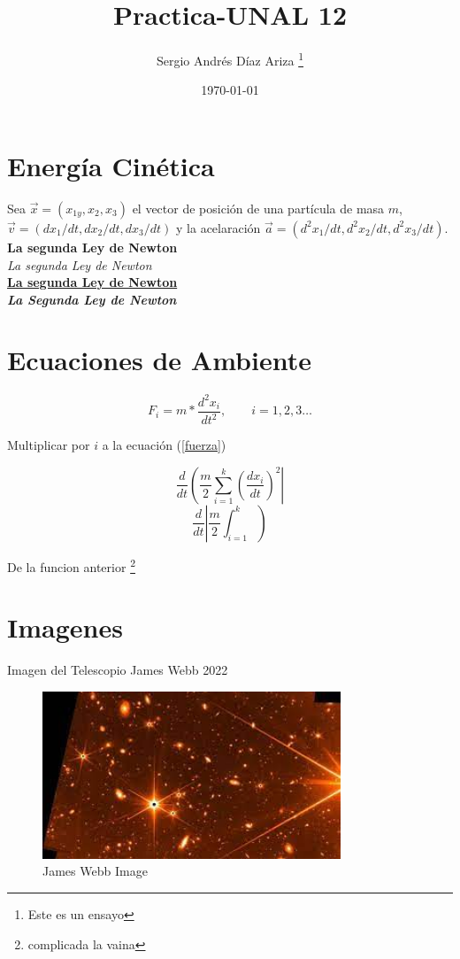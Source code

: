 \documentclass{article}
\title{Practica-UNAL 12}
\author{Sergio Andrés Díaz Ariza \thanks{Este es un ensayo}}
\date{\today}
\begin{document}
\tableofcontents

\section{Energía Cinética} %
Sea $\vec{x}=(x_{1y},x_2,x_3)$ el vector de posición de una partícula de masa $m$,
    $\vec{v}=(dx_1/dt,dx_2/dt,dx_3/dt)$ y la acelaración $\vec{a}=(d^2x_1/dt,d^2x_2/dt,d^2x_3/dt)$.
    \\
    \textbf{La segunda Ley de Newton}\\
    \textit{La segunda Ley de Newton}\\
    \underline{\textbf{La segunda Ley de Newton}}\\
    \textbf{\textit{La Segunda Ley de Newton}}\\
    
    \section{Ecuaciones de Ambiente}
    \begin{equation}
        F_i = m*\frac{d^2x_i}{dt^2},\qquad i=1,2,3\dots \label{fuerza}
    \end{equation}

    Multiplicar por $i$ a la ecuación (\ref{fuerza})

    \begin{equation*}
        \frac{d}{dt}\left(\frac{m}{2}\sum_{i=1}^k\left(\frac{dx_i}{dt} \right)^2 \right|
    \end{equation*}
    \begin{equation*}
        \frac{d}{dt}\left|\frac{m}{2}\int_{i=1}^k \right)
    \end{equation*}

    De la funcion anterior \footnote{complicada la vaina}
    
    \section{Imagenes}
    Imagen del Telescopio James Webb 2022
    \begin{figure}[H]
        \centering
        \includegraphics[height=5cm]{Images/James}
        \caption{James Webb Image}
        \label{img1}
    \end{figure}
\end{document}
